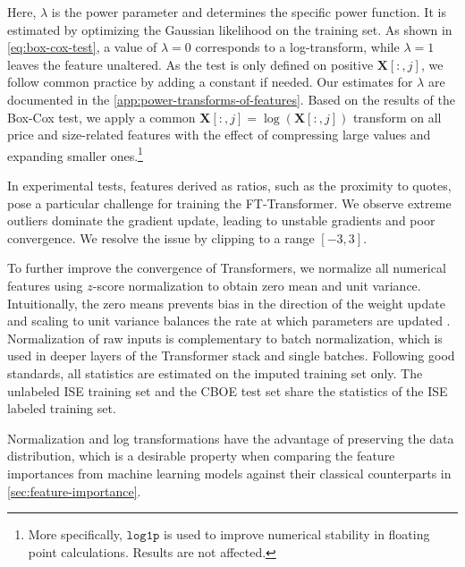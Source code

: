 Here, $\lambda$ is the power parameter and determines the specific power function. It is estimated by optimizing the Gaussian likelihood on the training set. As shown in \cref{eq:box-cox-test}, a value of $\lambda=0$ corresponds to a log-transform, while $\lambda=1$ leaves the feature unaltered. As the test is only defined on positive $\mathbf{X}\left[:,j\right]$, we follow common practice by adding a constant if needed. Our estimates for $\lambda$ are documented in the \cref{app:power-transforms-of-features}. Based on the results of the Box-Cox test, we apply a common $\mathbf{X}\left[:,j\right]=\log(\mathbf{X}\left[:,j\right])$ transform on all price and size-related features with the effect of compressing large values and expanding smaller ones.\footnote{More specifically, $\mathtt{log1p}$ is used to improve numerical stability in floating point calculations. Results are not affected.} 

In experimental tests, features derived as ratios, such as the proximity to quotes, pose a particular challenge for training the FT-Transformer. We observe extreme outliers dominate the gradient update, leading to unstable gradients and poor convergence. We resolve the issue by clipping to a range $[-3,3]$.

To further improve the convergence of Transformers, we normalize all numerical features using $z$-score normalization to obtain zero mean and unit variance. Intuitionally, the zero means prevents bias in the direction of the weight update and scaling to unit variance balances the rate at which parameters are updated \autocite[\checkmark][16--17]{lecunEfficientBackProp2012}. Normalization of raw inputs is complementary to batch normalization, which is used in deeper layers of the Transformer stack and single batches. Following good standards, all statistics are estimated on the imputed training set only. The unlabeled \gls{ISE} training set and the \gls{CBOE} test set share the statistics of the \gls{ISE} labeled training set.

Normalization and log transformations have the advantage of preserving the data distribution, which is a desirable property when comparing the feature importances from machine learning models against their classical counterparts in \cref{sec:feature-importance}.

